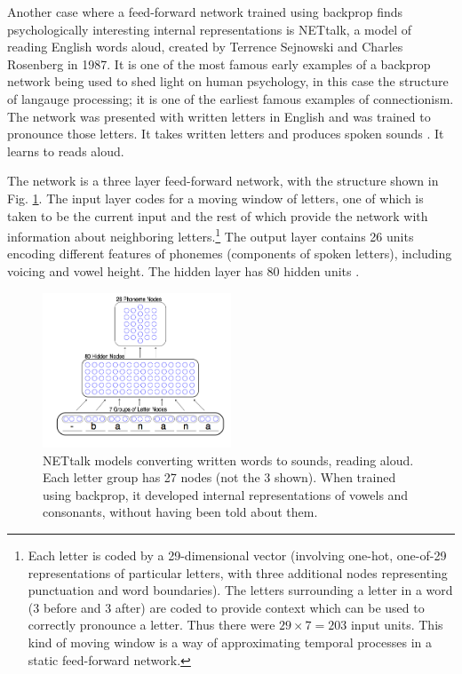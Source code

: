Another case where a feed-forward network trained using backprop finds psychologically interesting internal representations is NETtalk, a model of reading English words aloud, created by Terrence Sejnowski and Charles Rosenberg in 1987. It is one of the most famous early examples of a backprop network being used to shed light on human psychology, in this case the structure of langauge processing; \ie it is one of the earliest famous examples of connectionism. The network was presented with written letters in English and was trained to pronounce those letters. It takes written letters and produces spoken sounds \cite{sejnowski1987parallel}. It learns to reads aloud.

The network is a three layer feed-forward network, with the structure shown in Fig. \ref{net_talk}. The input layer codes for a moving window of letters, one of which is taken to be the current input and the rest of which provide the network with information about neighboring letters.\footnote{Each letter is coded by a 29-dimensional vector (involving one-hot, one-of-29 representations of particular letters, with three additional nodes representing punctuation and word boundaries). The letters surrounding a letter in a word (3 before and 3 after) are coded to provide context which can be used to  correctly pronounce a letter. Thus there were $29 \times 7 = 203$ input units. This kind of moving window is a way of approximating temporal processes in a static feed-forward network.} The output layer contains 26 units encoding different features of phonemes (components of spoken letters), including voicing and vowel height. The hidden layer has 80 hidden units \cite{sejnowski1987parallel}. 

\begin{figure}[h]
\centering
\includegraphics[width=0.5\textwidth]{images/net_talk.png}
\caption[Pamela Payne.]{NETtalk models converting written words to sounds, \ie reading aloud. Each letter group has 27 nodes (not the 3 shown). When trained using backprop, it developed internal representations of vowels and consonants, without having been told about them.}
\label{net_talk}
\end{figure}

